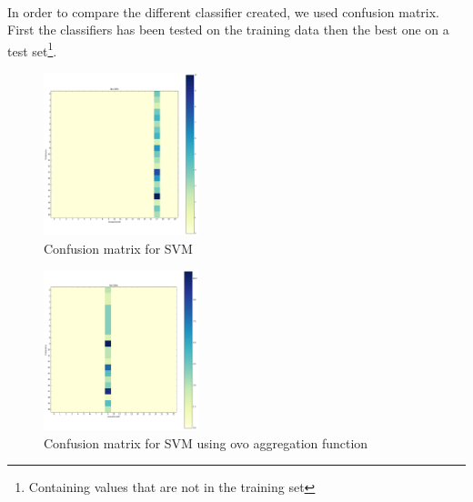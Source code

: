 \paragraph{}
In order to compare the different classifier created, we used confusion matrix. First the classifiers has been tested on the training data then the best one on a test set\footnote{Containing values that are not in the training set}. 
\newpage
\begin{multicols}{2}
	\begin{figure}[H]
		\centering
		\includegraphics[width=0.4\textwidth]{classifier_svm}
		\caption{Confusion matrix for SVM}
		\label{svm}
	\end{figure}

	\begin{figure}[H]
		\centering
		\includegraphics[width=0.4\textwidth]{classifier_svm_ovo}
		\caption{Confusion matrix for SVM using ovo aggregation function}
		\label{svm_ovo}
	\end{figure}
	
\end{multicols}

